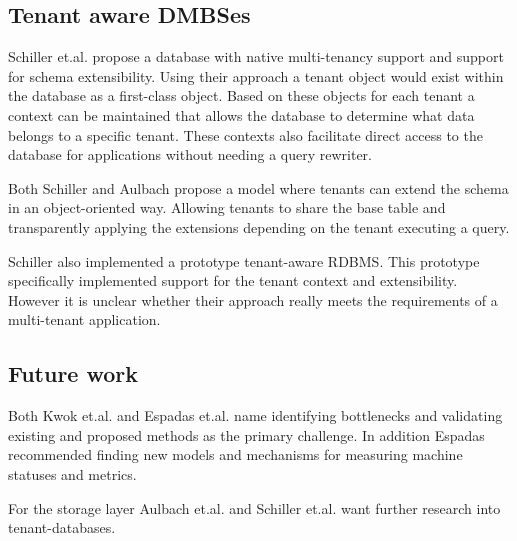 \subsection{Tenant aware DMBSes}
Schiller et.al.\cite{schiller2011native} propose a database with native multi-tenancy support and support for schema extensibility.
Using their approach a tenant object would exist within the database as a first-class object. 
Based on these objects for each tenant a context can be maintained that allows the database to determine what data belongs to a specific tenant. 
These contexts also facilitate direct access to the database for applications without needing a query rewriter.

Both Schiller \cite{schiller2011native} and Aulbach \cite{aulbach2011extensibility} propose a model where tenants can extend the schema in an object-oriented way.
Allowing tenants to share the base table and transparently applying the extensions depending on the tenant executing a query.

Schiller also implemented a prototype tenant-aware RDBMS.
This prototype specifically implemented support for the tenant context and extensibility.
However it is unclear whether their approach really meets the requirements of a multi-tenant application.



\subsection{Future work}
Both Kwok et.al. \cite{kwok2008resource} and Espadas et.al.\cite{espadas2013tenant} name identifying bottlenecks and validating existing and proposed methods as the primary challenge.
In addition Espadas recommended finding new models and mechanisms for measuring machine statuses and metrics.

For the storage layer Aulbach et.al. \cite{aulbach2009comparison, aulbach2008multi} and Schiller et.al. \cite{schiller2011native} want further research into tenant-databases.

